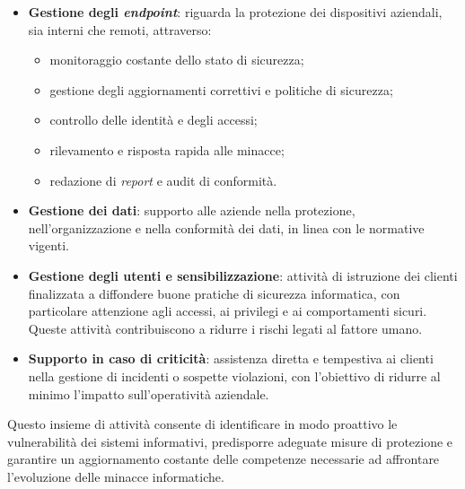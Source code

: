 \begin{itemize}
    \item \textbf{Gestione degli \textit{endpoint}}: riguarda la protezione dei dispositivi aziendali, sia interni che remoti, attraverso:
    \begin{itemize}
        \item monitoraggio costante dello stato di sicurezza;
        \item gestione degli aggiornamenti correttivi e politiche di sicurezza;
        \item controllo delle identità e degli accessi;
        \item rilevamento e risposta rapida alle minacce;
        \item redazione di \textit{report} e \gls{audit} di conformità.
    \end{itemize}


    \item \textbf{Gestione dei dati}: supporto alle aziende nella protezione, nell'organizzazione e nella conformità dei dati, in linea con le normative vigenti.

    \item \textbf{Gestione degli utenti e sensibilizzazione}: attività di istruzione dei clienti finalizzata a diffondere buone pratiche di sicurezza informatica, con particolare attenzione agli accessi, ai privilegi e ai comportamenti sicuri. Queste attività contribuiscono a ridurre i rischi legati al fattore umano.

    \item \textbf{Supporto in caso di criticità}: assistenza diretta e tempestiva ai clienti nella gestione di incidenti o sospette violazioni, con l'obiettivo di ridurre al minimo l'impatto sull'operatività aziendale.
\end{itemize}

Questo insieme di attività consente di identificare in modo proattivo le vulnerabilità dei sistemi informativi, predisporre adeguate misure di protezione e garantire un aggiornamento costante delle competenze necessarie ad affrontare l'evoluzione delle minacce informatiche.
